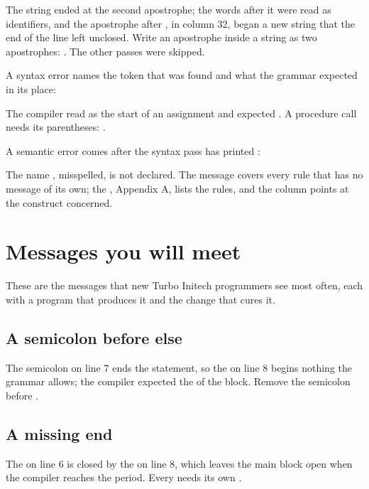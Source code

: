 

The string  ended at the second apostrophe; the words after it
were read as identifiers, and the apostrophe after , in column 32,
began a new string that the end of the line left unclosed.  Write an
apostrophe inside a string as two apostrophes: .  The other
passes were skipped.

A syntax error names the token that was found and what the grammar
expected in its place:



The compiler read  as the start of an assignment and expected
\code{:=}.  A procedure call needs its parentheses: .

A semantic error comes after the syntax pass has printed
:



The name , misspelled, is not declared.  The message
 covers every rule that has no message of its
own; the , Appendix A, lists the rules, and
the column points at the construct concerned.

\section{Messages you will meet}
These are the messages that new Turbo Initech programmers see most often,
each with a program that produces it and the change that cures it.

\subsection{A semicolon before else}
The semicolon on line 7 ends the  statement, so the  on line
8 begins nothing the grammar allows; the compiler expected the  of
the block.  Remove the semicolon before .

\subsection{A missing end}
The  on line 6 is closed by the  on line 8, which leaves the
main block open when the compiler reaches the period.  Every  needs
its own .

